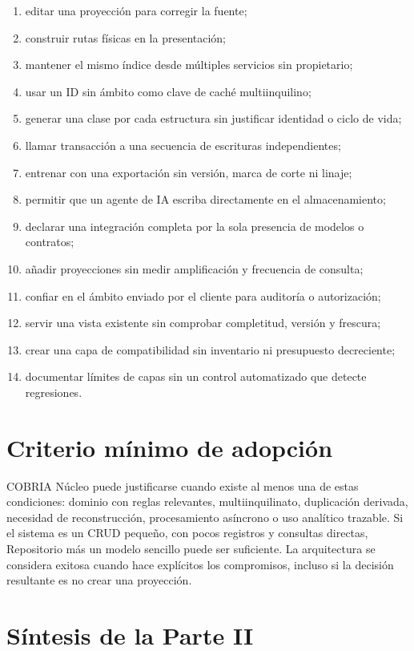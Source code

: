 \begin{enumerate}[leftmargin=*]
  \item editar una proyección para corregir la fuente;
  \item construir rutas físicas en la presentación;
  \item mantener el mismo índice desde múltiples servicios sin propietario;
  \item usar un ID sin ámbito como clave de caché multiinquilino;
  \item generar una clase por cada estructura sin justificar identidad o ciclo de vida;
  \item llamar transacción a una secuencia de escrituras independientes;
  \item entrenar con una exportación sin versión, marca de corte ni linaje;
  \item permitir que un agente de IA escriba directamente en el almacenamiento;
  \item declarar una integración completa por la sola presencia de modelos o contratos;
  \item añadir proyecciones sin medir amplificación y frecuencia de consulta;
  \item confiar en el ámbito enviado por el cliente para auditoría o autorización;
  \item servir una vista existente sin comprobar completitud, versión y frescura;
  \item crear una capa de compatibilidad sin inventario ni presupuesto decreciente;
  \item documentar límites de capas sin un control automatizado que detecte regresiones.
\end{enumerate}

\section{Criterio mínimo de adopción}

COBRIA Núcleo puede justificarse cuando existe al menos una de estas condiciones: dominio
con reglas relevantes, multiinquilinato, duplicación derivada, necesidad de reconstrucción,
procesamiento asíncrono o uso analítico trazable. Si el sistema es un CRUD pequeño, con
pocos registros y consultas directas, Repositorio más un modelo sencillo puede ser
suficiente. La arquitectura se considera exitosa cuando hace explícitos los compromisos,
incluso si la decisión resultante es no crear una proyección.

\section{Síntesis de la Parte II}

